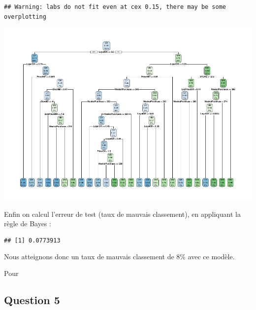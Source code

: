 \documentclass[
]{article}
\newenvironment{Shaded}{\begin{snugshade}}{\end{snugshade}}
\newcommand{\DecValTok}[1]{\textcolor[rgb]{0.00,0.00,0.81}{#1}}
\newcommand{\KeywordTok}[1]{\textcolor[rgb]{0.13,0.29,0.53}{\textbf{#1}}}
\newcommand{\NormalTok}[1]{#1}
\newcommand{\OperatorTok}[1]{\textcolor[rgb]{0.81,0.36,0.00}{\textbf{#1}}}
\newcommand{\StringTok}[1]{\textcolor[rgb]{0.31,0.60,0.02}{#1}}
\begin{document}
\begin{verbatim}
## Warning: labs do not fit even at cex 0.15, there may be some overplotting
\end{verbatim}

\includegraphics{durand_eltarr_files/figure-latex/unnamed-chunk-14-1.pdf}

Enfin on calcul l'erreur de test (taux de mauvais classement), en
appliquant la règle de Bayes :

\begin{Shaded}
\end{Shaded}

\begin{verbatim}
## [1] 0.0773913
\end{verbatim}

Nous atteignons donc un taux de mauvais classement de 8\% avec ce
modèle.

Pour

\hypertarget{question-5}{%
\subsection{Question 5}\label{question-5}}
\end{document}
